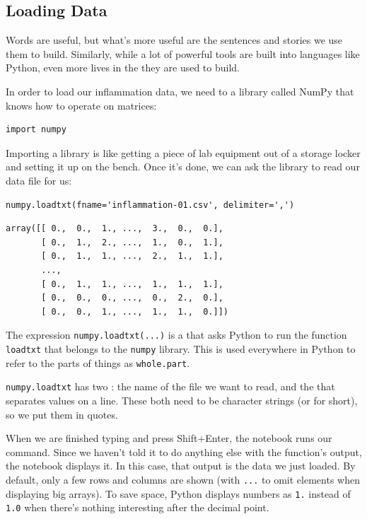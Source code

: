 \documentclass{book}
\begin{document}
\subsection{Loading Data}

Words are useful, but what's more useful are the sentences and stories
we use them to build. Similarly, while a lot of powerful tools are built
into languages like Python, even more lives in the
 they are used to build.

In order to load our inflammation data, we need to
 a library called NumPy that knows how to
operate on matrices:

\begin{verbatim}
import numpy
\end{verbatim}

Importing a library is like getting a piece of lab equipment out of a
storage locker and setting it up on the bench. Once it's done, we can
ask the library to read our data file for us:

\begin{verbatim}
numpy.loadtxt(fname='inflammation-01.csv', delimiter=',')
\end{verbatim}

\begin{verbatim}
array([[ 0.,  0.,  1., ...,  3.,  0.,  0.],
       [ 0.,  1.,  2., ...,  1.,  0.,  1.],
       [ 0.,  1.,  1., ...,  2.,  1.,  1.],
       ...,
       [ 0.,  1.,  1., ...,  1.,  1.,  1.],
       [ 0.,  0.,  0., ...,  0.,  2.,  0.],
       [ 0.,  0.,  1., ...,  1.,  1.,  0.]])
\end{verbatim}

The expression \texttt{numpy.loadtxt(...)} is a
 that asks Python to run the
function \texttt{loadtxt} that belongs to the \texttt{numpy} library.
This  is used everywhere in
Python to refer to the parts of things as \texttt{whole.part}.

\texttt{numpy.loadtxt} has two : the
name of the file we want to read, and the
 that separates values on a line. These
both need to be character strings (or  for
short), so we put them in quotes.

When we are finished typing and press Shift+Enter, the notebook runs our
command. Since we haven't told it to do anything else with the
function's output, the notebook displays it. In this case, that output
is the data we just loaded. By default, only a few rows and columns are
shown (with \texttt{...} to omit elements when displaying big arrays).
To save space, Python displays numbers as \texttt{1.} instead of
\texttt{1.0} when there's nothing interesting after the decimal point.
\end{document}
